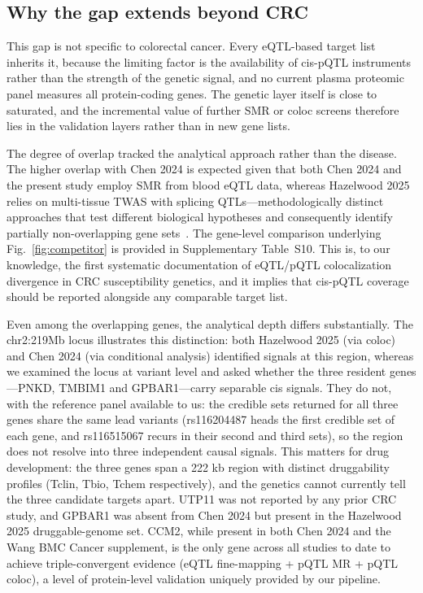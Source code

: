 \documentclass[11pt,a4paper]{article}
\begin{document}
\subsection*{Why the gap extends beyond CRC}

This gap is not specific to colorectal cancer. Every eQTL-based target list
inherits it, because the limiting factor is the availability of cis-pQTL
instruments rather than the strength of the genetic signal, and no current
plasma proteomic panel measures all protein-coding genes. The genetic layer
itself is close to saturated, and the incremental value of further SMR or coloc
screens therefore lies in the validation layers rather than in new gene lists.

The degree of overlap tracked the analytical approach rather than the
disease. The higher overlap with Chen 2024 is expected given that both Chen 2024 and the present
study employ SMR from blood eQTL data, whereas Hazelwood 2025 relies on
multi-tissue TWAS with splicing QTLs---methodologically distinct approaches
that test different biological hypotheses and consequently identify partially non-overlapping gene sets~\cite{chen2024integrative, hazelwood2025multi}. The gene-level comparison underlying Fig.~\ref{fig:competitor} is provided in Supplementary Table~S10.
This is, to our knowledge, the first systematic documentation of
eQTL/pQTL
colocalization divergence in CRC susceptibility genetics, and it implies that
cis-pQTL coverage should be reported alongside any comparable target list.


Even among the overlapping genes, the analytical depth differs
substantially. The chr2:219Mb locus illustrates this distinction: both
Hazelwood 2025 (via coloc) and Chen 2024 (via conditional analysis) identified
signals at this region, whereas we examined the locus at variant level and asked
whether the three resident genes---PNKD, TMBIM1 and GPBAR1---carry separable cis
signals. They do not, with the reference panel available to us: the credible sets
returned for all three genes share the same lead variants (rs116204487 heads the
first credible set of each gene, and rs116515067 recurs in their second and third
sets), so the region does not resolve into three independent causal signals. This
matters for drug development: the three genes span a 222 kb region with distinct
druggability profiles (Tclin, Tbio, Tchem respectively), and the genetics cannot
currently tell the three candidate targets apart. UTP11 was not reported by any prior CRC study, and GPBAR1 was
absent from Chen 2024 but present in the Hazelwood 2025 druggable-genome set. CCM2, while present in both Chen 2024 and the Wang
BMC Cancer supplement, is the only gene across all studies to date to achieve
triple-convergent evidence (eQTL fine-mapping + pQTL MR + pQTL coloc), a level
of protein-level validation uniquely provided by our pipeline.
\end{document}
